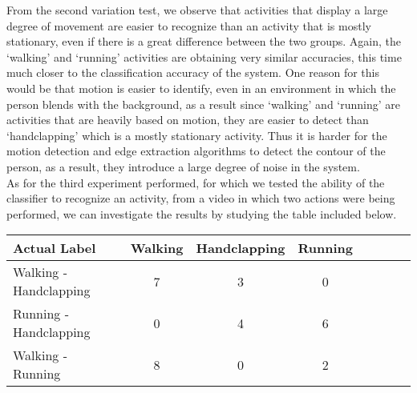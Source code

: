 \documentclass[11pt]{report}
\begin{document}
From the second variation test, we observe that activities that display a large degree of movement are easier to recognize than an activity that is mostly stationary, even if there is a great difference between the two groups. Again, the `walking' and `running' activities are obtaining very similar accuracies, this time much closer to the classification accuracy of the system. One reason for this would be that motion is easier to identify, even in an environment in which the person blends with the background, as a result since `walking' and `running' are activities that are heavily based on motion, they are easier to detect than `handclapping' which is a mostly stationary activity. Thus it is harder for the motion detection and edge extraction algorithms to detect the contour of the person, as a result, they introduce a large degree of noise in the system. \\

As for the third experiment performed, for which we tested the ability of the classifier to recognize an activity, from a video in which two actions were being performed, we can investigate the results by studying the table included below.\\

\begin{tabular}{l*{6}{c}r}
Actual Label              & Walking & Handclapping & Running \\
\hline
Walking - Handclapping & 7 & 3 & 0  \\
Running - Handclapping            & 0 & 4 & 6 \\
Walking - Running           & 8 & 0 & 2 \\
\end{tabular}\\
\end{document}
